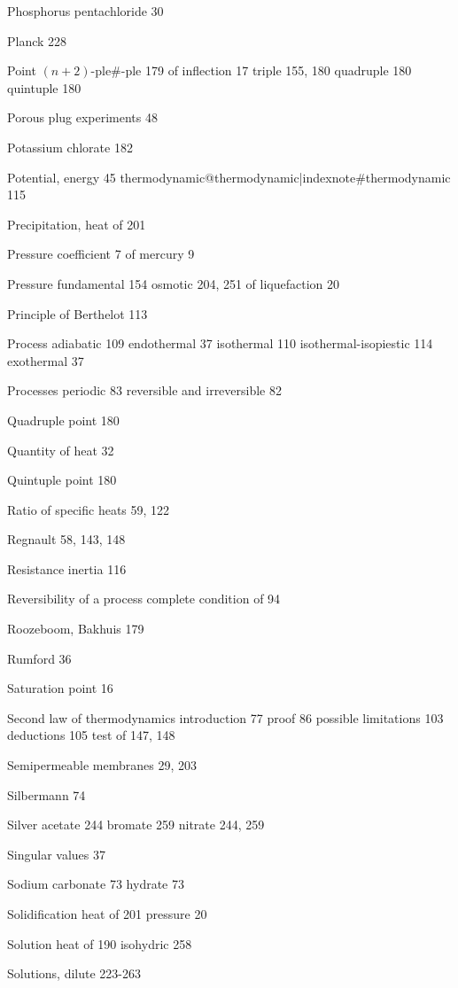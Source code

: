 \documentclass[12pt]{book}[2005/09/16]
\newcommand{\PageSep}[1]{\ignorespaces}
\begin{document}
Phosphorus pentachloride 30

Planck 228

Point
  $(n + 2)$-ple#-ple 179
  of inflection 17
  triple 155, 180
  quadruple 180
  quintuple 180

Porous plug experiments 48

Potassium chlorate 182

Potential, energy 45
  thermodynamic@thermodynamic|indexnote#thermodynamic 115

Precipitation, heat of 201

Pressure coefficient 7
  of mercury 9

Pressure
  fundamental 154
  osmotic 204, 251
  of liquefaction 20

Principle of Berthelot 113

Process
  adiabatic 109
  endothermal 37
  isothermal 110
  isothermal-isopiestic 114
  exothermal 37

Processes
  periodic 83
  reversible and irreversible 82



Quadruple point 180

Quantity of heat 32

Quintuple point 180



Ratio of specific heats 59, 122

Regnault 58, 143, 148

Resistance inertia 116

Reversibility of a process
  complete
    condition of 94

Roozeboom, Bakhuis 179

Rumford 36



Saturation point 16

Second law of thermodynamics
  introduction 77
  proof 86
  possible limitations 103
  deductions 105
  test of 147, 148

Semipermeable membranes 29, 203

Silbermann 74

Silver
  acetate 244
  bromate 259
  nitrate 244, 259

Singular values 37

Sodium
  carbonate 73
  hydrate 73

Solidification
  heat of 201
  pressure 20

Solution
  heat of 190
  isohydric 258

Solutions, dilute 223-263
\end{document}
